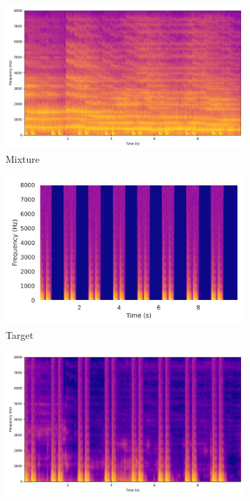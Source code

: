 \begin{figure}[htbp]
    \centering
    \begin{subfigure}[b]{0.22\textwidth}
        \centering
        \includegraphics[width=\textwidth]{plots/onepeace_best_sdr/onepeace mixture_spectrogram.png}
        \caption*{Mixture}
    \end{subfigure}
     \begin{subfigure}[b]{0.22\textwidth}
        \centering
        \includegraphics[width=\textwidth]{plots/onepeace_best_sdr/onepeace target_spectrogram.png}
        \caption*{Target}
    \end{subfigure}
    \begin{subfigure}[b]{0.22\textwidth}
        \centering
        \includegraphics[width=\textwidth]{plots/onepeace_best_sdr/onepeace sep_spectrogram.png}

\end{subfigure}
\end{figure}
